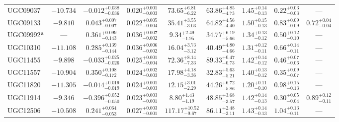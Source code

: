\documentclass[twocolumn,tighten]{aastex63}
\begin{document}
\begin{table}
\begin{center}
\begin{tabular}{lcccccccc}
   UGC09037 & $ -10.734 $ & $ -0.012 _{ -0.036 } ^{ + 0.038 } $ & $ 0.020 _{ -0.003 } ^{ + 0.001 } $ & $ 73.65 _{ -6.22 } ^{ + 6.81 } $ & $ 63.86 _{ -4.73 } ^{ + 4.85 } $ & $ 1.45 _{ -0.13 } ^{ + 0.14 } $ & $ 0.22 _{ -0.03 } ^{ + 0.03 } $ & --- \\  
   UGC09133 & $ -9.810  $ & $ 0.043 _{ -0.007 } ^{ + 0.007 } $ & $ 0.022 _{ -0.004 } ^{ + 0.005 } $ & $ 35.41 _{ -3.03 } ^{ + 3.55 } $ & $ 64.82 _{ -4.40 } ^{ + 4.56 } $ & $ 1.50 _{ -0.13 } ^{ + 0.15 } $ & $ 0.83 _{ -0.09 } ^{ + 0.09 } $ & $ 0.72 _{ -0.04 } ^{ + 0.04 } $  \\  
   UGC09992$^{\rm a}$ &  ---  & $ 0.361 _{ -0.143 } ^{ + 0.099 } $ & $ 0.036 _{ -0.002 } ^{ + 0.007 } $ & $ 9.34 _{ -1.95 } ^{ + 2.49 } $ & $ 34.77 _{ -5.66 } ^{ + 6.19 } $ & $ 1.34 _{ -0.12 } ^{ + 0.13 } $ & $ 0.50 _{ -0.10 } ^{ + 0.12 } $ & --- \\  
   UGC10310 & $ -11.108 $ & $ 0.285 _{ -0.144 } ^{ + 0.139 } $ & $ 0.036 _{ -0.002 } ^{ + 0.006 } $ & $ 16.04 _{ -3.12 } ^{ + 3.73 } $ & $ 40.49 _{ -4.66 } ^{ + 4.80 } $ & $ 1.31 _{ -0.11 } ^{ + 0.12 } $ & $ 0.66 _{ -0.11 } ^{ + 0.14 } $ & --- \\  
   UGC11455 & $ -9.898 $ & $ -0.033 _{ -0.026 } ^{ + 0.025 } $ & $ 0.025 _{ -0.004 } ^{ + 0.001 } $ & $ 72.36 _{ -7.33 } ^{ + 8.14 } $ & $ 89.33 _{ -0.73 } ^{ + 0.47 } $ & $ 1.42 _{ -0.12 } ^{ + 0.14 } $ & $ 0.46 _{ -0.06 } ^{ + 0.07 } $ & --- \\  
   UGC11557 & $ -10.904 $ & $ 0.350 _{ -0.172 } ^{ + 0.108 } $ & $ 0.024 _{ -0.003 } ^{ + 0.002 } $ & $ 17.98 _{ -3.36 } ^{ + 4.18 } $ & $ 32.83 _{ -5.21 } ^{ + 5.63 } $ & $ 1.40 _{ -0.12 } ^{ + 0.13 } $ & $ 0.35 _{ -0.07 } ^{ + 0.09 } $ & --- \\  
   UGC11820 & $ -11.305 $ & $ -0.014 _{ -0.019 } ^{ + 0.019 } $ & $ 0.024 _{ -0.003 } ^{ + 0.001 } $ & $ 12.15 _{ -2.29 } ^{ + 3.01 } $ & $ 44.26 _{ -5.86 } ^{ + 6.72 } $ & $ 1.20 _{ -0.10 } ^{ + 0.11 } $ & $ 0.98 _{ -0.13 } ^{ + 0.15 } $ & --- \\  
   UGC11914 & $ -9.346  $ & $ -0.396 _{ -0.050 } ^{ + 0.052 } $ & $ 0.023 _{ -0.001 } ^{ + 0.003 } $ & $ 8.80 _{ -1.19 } ^{ + 1.43 } $ & $ 48.85 _{ -3.57 } ^{ + 3.68 } $ & $ 1.42 _{ -0.13 } ^{ + 0.14 } $ & $ 0.30 _{ -0.04 } ^{ + 0.05 } $ & $ 0.89 _{ -0.11 } ^{ + 0.12 } $  \\  
   UGC12506 & $ -10.508 $ & $ 0.241 _{ -0.053 } ^{ + 0.064 } $ & $ 0.027 _{ -0.001 } ^{ + 0.003 } $ & $ 117.17 _{ -9.67 } ^{ + 10.52 } $ & $ 86.11 _{ -3.11 } ^{ + 2.48 } $ & $ 1.43 _{ -0.13 } ^{ + 0.14 } $ & $ 1.04 _{ -0.11 } ^{ + 0.13 } $ & --- \\  

\end{tabular}
\end{center}
\end{table}
\end{document}
